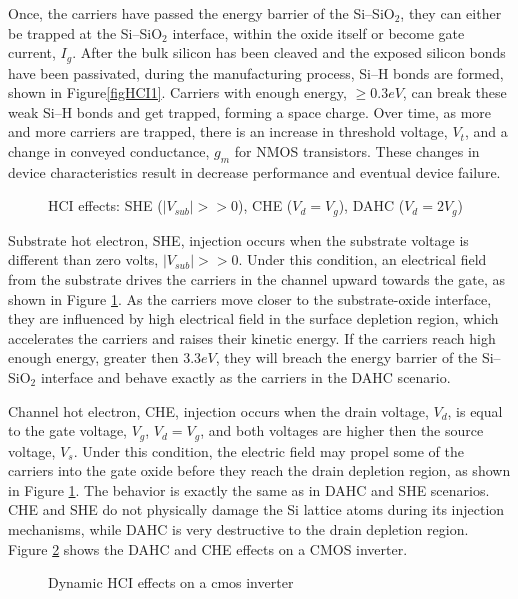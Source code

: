 \documentclass[12pt,conference]{IEEEtran}
\begin{document}
Once, the carriers have passed the energy barrier
of the Si--SiO$_2$, they can either be trapped at the Si--SiO$_2$
interface, within the oxide itself or  become gate current, $I_g$.
After the bulk silicon has been cleaved  and the exposed silicon bonds have been passivated,
during the manufacturing process, Si--H bonds are formed,
shown in Figure\ref{figHCI1}. Carriers with enough energy,
$\geq 0.3eV$, can break these weak Si--H bonds and get trapped,
forming a space charge.
Over time, as more and more carriers are trapped, there is an increase in  threshold voltage, $V_t$,
and a change in  conveyed conductance, $g_m$ for NMOS transistors.
These changes in device characteristics result in decrease performance and eventual device failure.      
\begin{figure}[htp]
\caption{HCI effects: SHE ($|V_{sub}|>>0$), CHE ($V_d=V_g$), DAHC ($V_d=2V_g$)}
\label{figHCI2}
\end{figure}


Substrate hot electron, SHE, injection occurs when the substrate voltage
is different than zero volts, $|V_{sub}| >> 0$.
Under this condition, an electrical field from the substrate drives
the carriers in the channel upward towards the gate,
as shown in Figure \ref{figHCI2}.
As the carriers move closer to the substrate-oxide interface,
they are influenced by high electrical field in the surface depletion region,
which accelerates the carriers and raises their kinetic energy.
If the carriers reach high enough energy, greater then $3.3eV$,
they will breach the energy barrier of the Si--SiO$_2$ interface
and behave exactly as the carriers in the DAHC scenario.  

Channel hot electron, CHE, injection occurs when the drain voltage,
$V_d$, is equal to the gate voltage, $V_g$, $V_d=V_g$,
and both voltages are higher then the source voltage, $V_s$.
Under this condition, the electric field may propel some of
the carriers into the gate oxide before they reach the drain
depletion region, as shown in Figure \ref{figHCI2}.
The behavior is exactly the same as in DAHC and SHE scenarios.
CHE and SHE do not physically damage the Si lattice atoms
during its injection mechanisms, while DAHC is very destructive
to the drain depletion region.    Figure \ref{figINVERTER} shows the DAHC and CHE effects on a 
CMOS inverter.

\begin{figure}[htp]
\caption{Dynamic HCI effects on a cmos inverter}
\label{figINVERTER}
\end{figure}
\end{document}
